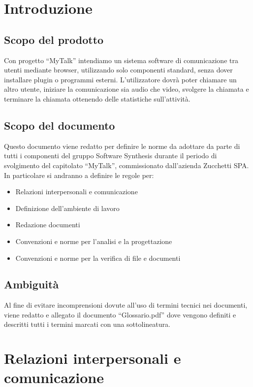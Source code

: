 

\setcounter{page}{1}
\pagestyle{normal}

\section{Introduzione}
\subsection{Scopo del prodotto}
Con progetto ``MyTalk'' intendiamo un sistema software di comunicazione tra utenti mediante browser, utilizzando solo componenti standard, senza dover installare plugin o programmi esterni. L'utilizzatore dovrà poter chiamare un altro utente, iniziare la comunicazione sia audio che video, svolgere la chiamata e terminare la chiamata ottenendo delle statistiche sull'attività.

\subsection{Scopo del documento}
Questo documento viene redatto per definire le norme da adottare da parte di tutti i componenti del gruppo Software Synthesis durante il periodo di svolgimento del capitolato ``MyTalk'', commissionato dall'azienda Zucchetti SPA. In particolare si andranno a definire le regole per:
\begin{itemize}
\item Relazioni interpersonali e comunicazione
\item Definizione dell'ambiente di lavoro
\item Redazione documenti
\item Convenzioni e norme per l'analisi e la progettazione
\item Convenzioni e norme per la verifica di file e documenti
\end{itemize}

\subsection{Ambiguità}
Al fine di evitare incomprensioni dovute all'uso di termini tecnici nei documenti, viene redatto e allegato il documento ``Glossario.pdf'' dove vengono definiti e descritti tutti i termini marcati con una sottolineatura.

\newpage
\section{Relazioni interpersonali e comunicazione}
